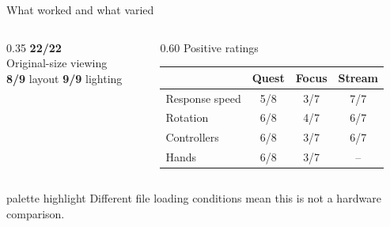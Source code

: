 \begin{frame}[c]{What worked and what varied}
\begin{columns}[c,onlytextwidth]
\begin{column}{0.35\textwidth}
\textcolor{unired}{\LARGE\textbf{22/22}}\\
Original-size viewing\\

\vspace{0.4cm}
\textcolor{unired}{\large\textbf{8/9}} layout \qquad
\textcolor{unired}{\large\textbf{9/9}} lighting
\end{column}
\begin{column}{0.60\textwidth}
\centering
\small Positive ratings
\vspace{0.15cm}

\begin{tabular}{lccc}
\toprule
& Quest & Focus & Stream\\
\midrule
Response speed & 5/8 & 3/7 & 7/7\\
Rotation & 6/8 & 4/7 & 6/7\\
Controllers & 6/8 & 3/7 & 6/7\\
Hands & 6/8 & 3/7 & --\\
\bottomrule
\end{tabular}
\end{column}
\end{columns}
\vspace{0.5cm}
\begin{beamercolorbox}[sep=0.55em,rounded=true]{palette highlight}
\centering\small Different file loading conditions mean this is not a hardware comparison.
\end{beamercolorbox}
\end{frame}
